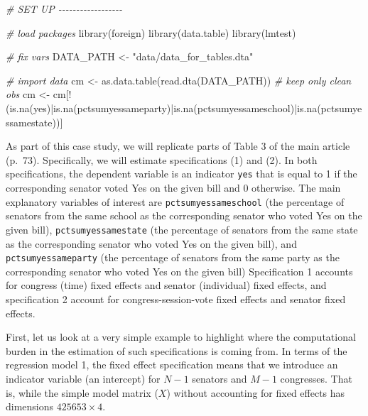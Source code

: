\documentclass[
  12pt,
]{style/krantz}
\newenvironment{Shaded}{\begin{snugshade}}{\end{snugshade}}
\newcommand{\CommentTok}[1]{\textcolor[rgb]{0.56,0.35,0.01}{\textit{#1}}}
\newcommand{\FunctionTok}[1]{\textcolor[rgb]{0.00,0.00,0.00}{#1}}
\newcommand{\NormalTok}[1]{#1}
\newcommand{\OtherTok}[1]{\textcolor[rgb]{0.56,0.35,0.01}{#1}}
\newcommand{\SpecialCharTok}[1]{\textcolor[rgb]{0.00,0.00,0.00}{#1}}
\newcommand{\StringTok}[1]{\textcolor[rgb]{0.31,0.60,0.02}{#1}}
\begin{document}
\begin{Shaded}
\begin{Highlighting}[]
\CommentTok{\# SET UP {-}{-}{-}{-}{-}{-}{-}{-}{-}{-}{-}{-}{-}{-}{-}{-}{-}{-}}


\CommentTok{\# load packages}
\FunctionTok{library}\NormalTok{(foreign)}
\FunctionTok{library}\NormalTok{(data.table)}
\FunctionTok{library}\NormalTok{(lmtest)}

\CommentTok{\# fix vars}
\NormalTok{DATA\_PATH }\OtherTok{\textless{}{-}} \StringTok{"data/data\_for\_tables.dta"}

\CommentTok{\# import data}
\NormalTok{cm }\OtherTok{\textless{}{-}} \FunctionTok{as.data.table}\NormalTok{(}\FunctionTok{read.dta}\NormalTok{(DATA\_PATH))}
\CommentTok{\# keep only clean obs}
\NormalTok{cm }\OtherTok{\textless{}{-}}\NormalTok{ cm[}\SpecialCharTok{!}\NormalTok{(}\FunctionTok{is.na}\NormalTok{(yes)}\SpecialCharTok{|}\FunctionTok{is.na}\NormalTok{(pctsumyessameparty)}\SpecialCharTok{|}\FunctionTok{is.na}\NormalTok{(pctsumyessameschool)}\SpecialCharTok{|}\FunctionTok{is.na}\NormalTok{(pctsumyessamestate))] }
\end{Highlighting}
\end{Shaded}

As part of this case study, we will replicate parts of Table 3 of the main article (p.~73). Specifically, we will estimate specifications (1) and (2). In both specifications, the dependent variable is an indicator \texttt{yes} that is equal to 1 if the corresponding senator voted Yes on the given bill and 0 otherwise. The main explanatory variables of interest are \texttt{pctsumyessameschool} (the percentage of senators from the same school as the corresponding senator who voted Yes on the given bill), \texttt{pctsumyessamestate} (the percentage of senators from the same state as the corresponding senator who voted Yes on the given bill), and \texttt{pctsumyessameparty} (the percentage of senators from the same party as the corresponding senator who voted Yes on the given bill) Specification 1 accounts for congress (time) fixed effects and senator (individual) fixed effects, and specification 2 account for congress-session-vote fixed effects and senator fixed effects.

First, let us look at a very simple example to highlight where the computational burden in the estimation of such specifications is coming from. In terms of the regression model 1, the fixed effect specification means that we introduce an indicator variable (an intercept) for \(N-1\) senators and \(M-1\) congresses. That is, while the simple model matrix (\(X\)) without accounting for fixed effects has dimensions \(425653\times4\).
\end{document}

